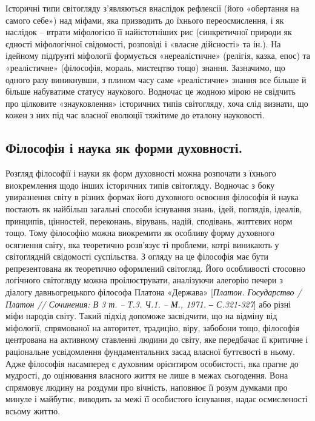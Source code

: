 Історичні типи світогляду з’являються внаслідок рефлексії (його «обертання
на самого себе») над міфами, яка призводить до їхнього переосмислення, і як
наслідок – втрати міфологією її найістотніших рис (синкретичної природи як
єдності міфологічної свідомості, розповіді і «власне дійсності» та ін.). На
ідейному підґрунті міфології формується «нереалістичне» (релігія, казка, епос)
та «реалістичне» (філософія, мораль, мистецтво тощо) знання. Зазначимо, що
одного разу виникнувши, з плином часу саме «реалістичне» знання все більше
й більше набуватиме статусу наукового. Водночас це жодною мірою не
свідчить про цілковите «знауковлення» історичних типів світогляду, хоча слід
визнати, що кожен з них під час власної еволюції тяжітиме до еталону
науковості.

\subsection{Філософія і наука як форми духовності.} Розгляд філософії і науки як
форм духовності можна розпочати з їхнього виокремлення щодо інших
історичних типів світогляду. Водночас з боку увиразнення світу в різних
формах його духовного освоєння філософія й наука постають як найбільш
загальні способи існування знань, ідей, поглядів, ідеалів, принципів, цінностей,
переконань, вірувань, надій, сподівань, життєвих норм тощо. Тому філософію
можна виокремити як особливу форму духовного осягнення світу, яка
теоретично розв’язує ті проблеми, котрі виникають у світоглядній свідомості
суспільства. З огляду на це філософія має бути репрезентована як теоретично
оформлений світогляд. Його особливості стосовно логічного світогляду можна
проілюструвати, аналізуючи алегорію печери з діалогу давньогрецького
філософа Платона «Держава» [\textit{Платон. Государство / Платон // Сочинения: В
3 т. – Т.3. Ч.1. – М., 1971. ‒ С.321-327}] або різні міфи народів світу. Такий
підхід допоможе засвідчити, що на відміну від міфології, спрямованої на
авторитет, традицію, віру, забобони тощо, філософія центрована на активному
ставленні людини до світу, яке передбачає її критичне і раціональне
усвідомлення фундаментальних засад власної буттєвості в ньому. Адже
філософія насамперед є духовним орієнтиром особистості, яка прагне до
мудрості, до оцінювання власного життя не лише в межах сьогодення. Вона
спрямовує людину на роздуми про вічність, наповнює її розум думками про
минуле і майбутнє, виводить за межі її особистого існування, надає
осмисленості всьому життю.


